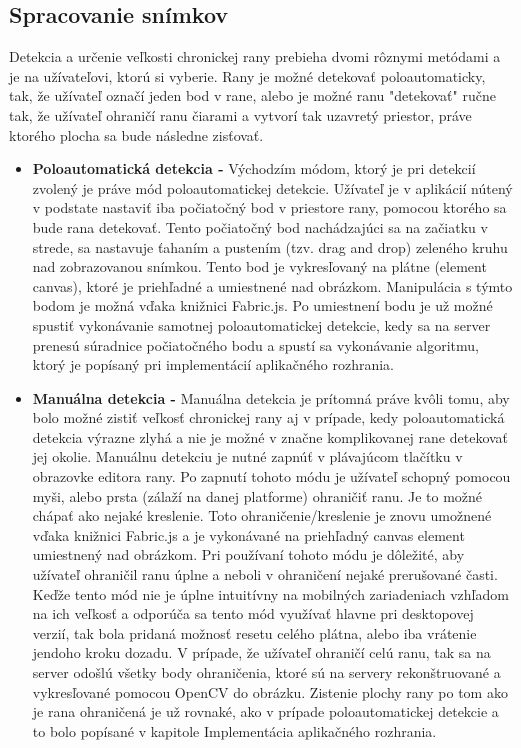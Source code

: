 \subsection{Spracovanie snímkov}
Detekcia a určenie veľkosti chronickej rany prebieha dvomi rôznymi metódami a je na užívateľovi, ktorú si vyberie. Rany je možné detekovať poloautomaticky, tak, že užívateľ označí jeden bod v rane, alebo je možné ranu "detekovať" ručne tak, že užívateľ ohraničí ranu čiarami a vytvorí tak uzavretý priestor, práve ktorého plocha sa bude následne zisťovať. 
\begin{itemize}
\item \textbf{Poloautomatická detekcia -} Východzím módom, ktorý je pri detekcií zvolený je práve mód poloautomatickej detekcie. Užívateľ je v aplikácií nútený v podstate nastaviť iba počiatočný bod v priestore rany, pomocou ktorého sa bude rana detekovať. Tento počiatočný bod nachádzajúci sa na začiatku v strede, sa nastavuje ťahaním a pustením (tzv. drag and drop) zeleného kruhu nad zobrazovanou snímkou. Tento bod je vykresľovaný na plátne (element canvas), ktoré je priehľadné a umiestnené nad obrázkom. Manipulácia s týmto bodom je možná vďaka knižnici Fabric.js. Po umiestnení bodu je už možné spustiť vykonávanie samotnej poloautomatickej detekcie, kedy sa na server prenesú súradnice počiatočného bodu a spustí sa vykonávanie algoritmu, ktorý je popísaný pri implementácií aplikačného rozhrania.  
\item \textbf{Manuálna detekcia -} Manuálna detekcia je prítomná práve kvôli tomu, aby bolo možné zistiť veľkosť chronickej rany aj v prípade, kedy poloautomatická detekcia výrazne zlyhá a nie je možné v značne komplikovanej rane detekovať jej okolie. Manuálnu detekciu je nutné zapnúť v plávajúcom tlačítku v obrazovke editora rany. Po zapnutí tohoto módu je užívateľ schopný pomocou myši, alebo prsta (zálaží na danej platforme) ohraničiť ranu. Je to možné chápať ako nejaké kreslenie. Toto ohraničenie/kreslenie je znovu umožnené vďaka knižnici Fabric.js a je vykonávané na priehľadný canvas element umiestnený nad obrázkom. Pri používaní tohoto módu je dôležité, aby užívateľ ohraničil ranu úplne a neboli v ohraničení nejaké prerušované časti. Keďže tento mód nie je úplne intuitívny na mobilných zariadeniach vzhľadom na ich veľkosť a odporúča sa tento mód využívať hlavne pri desktopovej verzií, tak bola pridaná možnosť resetu celého plátna, alebo iba vrátenie jendoho kroku dozadu.  V prípade, že užívateľ ohraničí celú ranu, tak sa na server odošlú všetky body ohraničenia, ktoré sú na servery rekonštruované a vykresľované pomocou OpenCV do obrázku. Zistenie plochy rany po tom ako je rana ohraničená je už rovnaké, ako v prípade poloautomatickej detekcie a to bolo popísané v kapitole Implementácia aplikačného rozhrania.

\end{itemize}
